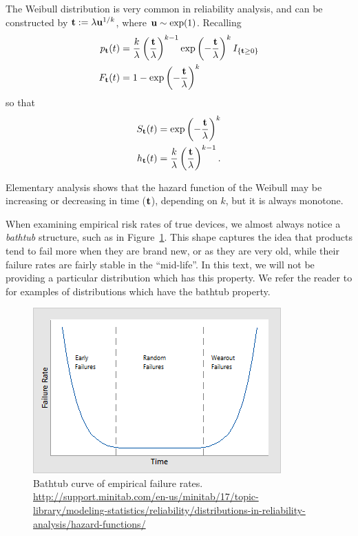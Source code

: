 \begin{example}
The Weibull distribution is very common in reliability analysis, and can be constructed by 
$\mathbf{t} := \lambda \mathbf{u}^{1/k}$, where $\mathbf{u} \sim \exp(1)$. 
Recalling
\begin{align}
	p_{\mathbf{t}} (t) &= \frac{k}{\lambda}\left(\frac{\mathbf{t}}{\lambda} \right)^{k-1} \exp\left(-\frac{\mathbf{t}}{\lambda} \right)^k  I_{\{ \mathbf{t}\geq 0 \}} \\
	F_{\mathbf{t}} (t) &= 1 - \exp \left(-\frac{\mathbf{t}}{\lambda} \right)^k 
\end{align}
so that 
\begin{align}
	S_{\mathbf{t}} (t) &= \exp \left(-\frac{\mathbf{t}}{\lambda} \right)^k \\
	h_{\mathbf{t}} (t) &= \frac{k}{\lambda} \left(\frac{\mathbf{t}}{\lambda} \right)^{k-1} .
\end{align}
\end{example}
Elementary analysis shows that the hazard function of the Weibull may be increasing or decreasing in time ($\mathbf{t}$), depending on $k$, but it is always monotone.




\begin{example}
When examining empirical risk rates of true devices, we almost always notice a \emph{bathtub} structure, such as in Figure~\ref{fig:bathtub}.
This shape captures the idea that products tend to fail more when they are brand new, or as they are very old, while their failure rates are fairly stable in the ``mid-life''.
In this text, we will not be providing a particular distribution which has this property. 
We refer the reader to \cite{nadarajah_bathtub-shaped_2008} for examples of distributions which have the bathtub property.
\end{example}


\begin{figure}[ht]
\centering
\includegraphics[width=0.5\linewidth]{art/bathtub_curve}
\caption[Bathtub empirical hazard curve]{Bathtub curve of empirical failure rates. \newline
\url{http://support.minitab.com/en-us/minitab/17/topic-library/modeling-statistics/reliability/distributions-in-reliability-analysis/hazard-functions/}}
\label{fig:bathtub}
\end{figure}




